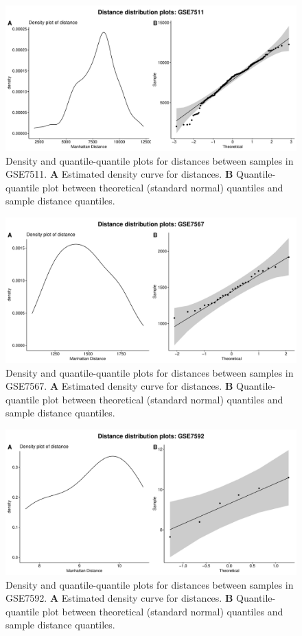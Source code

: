 \documentclass[10pt,letterpaper]{article}\usepackage[]{graphicx}\usepackage[]{color}
\begin{document}
\begin{figure}[H]
	\includegraphics[width=\textwidth]{manhattan-distance_hist_GSE7511.pdf}
	\caption{Density and quantile-quantile plots for distances between samples in GSE7511. \textbf{A} Estimated density curve for distances. \textbf{B} Quantile-quantile plot between theoretical (standard normal) quantiles and sample distance quantiles.}
\end{figure}

\begin{figure}[H]
	\includegraphics[width=\textwidth]{manhattan-distance_hist_GSE7567.pdf}
	\caption{Density and quantile-quantile plots for distances between samples in GSE7567. \textbf{A} Estimated density curve for distances. \textbf{B} Quantile-quantile plot between theoretical (standard normal) quantiles and sample distance quantiles.}
\end{figure}

\begin{figure}[H]
	\includegraphics[width=\textwidth]{manhattan-distance_hist_GSE7592.pdf}
	\caption{Density and quantile-quantile plots for distances between samples in GSE7592. \textbf{A} Estimated density curve for distances. \textbf{B} Quantile-quantile plot between theoretical (standard normal) quantiles and sample distance quantiles.}
\end{figure}
\end{document}
